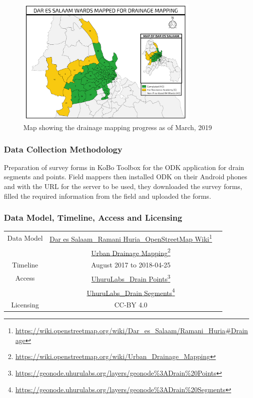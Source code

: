 \documentclass[a4paper,12pt,twoside]{article}
\begin{document}
\begin{figure}[h]
  \color{RHgreen}\caption{Map showing the drainage mapping progress as of March, 2019}
  \centering
  \includegraphics[width=0.8\textwidth]{images/Drain_Mapping.png}
\end{figure}

\subsubsection{Data Collection Methodology}
Preparation of survey forms in KoBo Toolbox for the ODK application for drain segments and points. Field mappers then installed ODK on their Android phones and with the URL for the server to be used, they downloaded the survey forms, filled the required information from the field and uploaded the forms.

\subsubsection{Data Model, Timeline, Access and Licensing}
\begin{center}
  \begin{tabular}{|c|c|c|}  
 \hline
    Data Model    &   \href{https://wiki.openstreetmap.org/wiki/Dar_es_Salaam/Ramani_Huria\#Drainage}{Dar es Salaam\_Ramani Huria\_OpenStreetMap Wiki}\footnote{\url{https://wiki.openstreetmap.org/wiki/Dar_es_Salaam/Ramani_Huria\#Drainage}}\\
    {} & \href{https://wiki.openstreetmap.org/wiki/Urban_Drainage_Mapping}{Urban Drainage Mapping}\footnote{\url{https://wiki.openstreetmap.org/wiki/Urban_Drainage_Mapping}}\\
\hline
   Timeline  & August 2017 to 2018-04-25 \\
\hline 
Access & {\href{https://geonode.uhurulabs.org/layers/geonode\%3ADrain\%20Points}{UhuruLabs\_Drain Points}\footnote{\url{https://geonode.uhurulabs.org/layers/geonode\%3ADrain\%20Points}}}\\
{} & {\href{https://geonode.uhurulabs.org/layers/geonode\%3ADrain\%20Segments}{UhuruLabs\_Drain Segments}\footnote{\url{https://geonode.uhurulabs.org/layers/geonode\%3ADrain\%20Segments}}} \\ 
 \hline      
  Licensing & CC-BY 4.0 \\
 \hline
\end{tabular}
\end{center}
\end{document}
